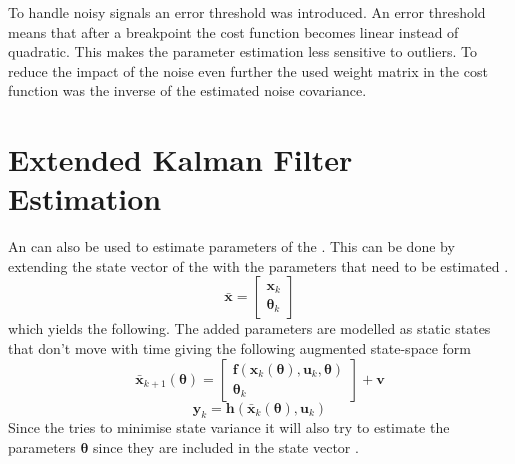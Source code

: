 To handle noisy signals an error threshold was introduced. An error threshold means that after a breakpoint the cost function becomes linear instead of quadratic. This makes the parameter estimation less sensitive to outliers. To reduce the impact of the noise even further the used weight matrix in the cost function was the inverse of the estimated noise covariance. 

\section{Extended Kalman Filter Estimation}
An \abbrEKF can also be used to estimate parameters of the \abbrROV. This can be done by extending the state vector of the \abbrEKF with the parameters that need to be estimated \citep{Roger}.
\begin{equation}
\bar{\boldsymbol{x}} = \begin{bmatrix}
\boldsymbol{x}_k\\
\boldsymbol{\theta}_k
\end{bmatrix}
\end{equation}
which yields the following.
The added parameters are modelled as static states that don't move with time giving the following augmented state-space form 
\begin{equation}
\bar{\boldsymbol{x}}_{k+1}(\boldsymbol{\theta}) =\begin{bmatrix}
\boldsymbol{f}(\boldsymbol{x}_k(\boldsymbol{\theta}),\boldsymbol{u}_k,\boldsymbol{\theta})\\
\boldsymbol{\theta}_k
\end{bmatrix} 
+\boldsymbol{v}
\end{equation}
\begin{equation}
\boldsymbol{y}_k=\boldsymbol{h}(\bar{\boldsymbol{x}}_k(\boldsymbol{\theta}),\boldsymbol{u}_k)
\end{equation}
Since the \abbrEKF tries to minimise state variance it will also try to estimate the parameters $\boldsymbol{\theta}$ since they are included in the state vector \citep{Roger}.

